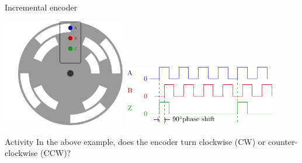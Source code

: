 \documentclass[presentation,aspectratio=169]{beamer}
\begin{document}
\begin{frame}[label={sec:org6511fde}]{Incremental encoder}
\begin{center}
\includegraphics[width=0.4\textwidth]{../../figures/encoder-disc}
\includegraphics[width=0.5\textwidth]{../../figures/encoder-signals}
\end{center}

\alert{Activity} In the above example, does the encoder turn clockwise (CW) or counter-clockwise (CCW)?
\end{frame}
\end{document}
